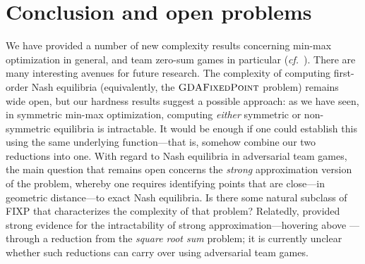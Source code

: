 \section{Conclusion and open problems}

We have provided a number of new complexity results concerning min-max optimization in general, and team zero-sum games in particular (\emph{cf.}~). There are many interesting avenues for future research. The complexity of computing first-order Nash equilibria (equivalently, the $\textsc{GDAFixedPoint}$ problem) remains wide open, but our hardness results suggest a possible approach: as we have seen, in symmetric min-max optimization, computing \emph{either} symmetric or non-symmetric equilibria is intractable. It would be enough if one could establish this using the same underlying function---that is, somehow combine our two reductions into one. With regard to Nash equilibria in adversarial team games, the main question that remains open concerns the \emph{strong} approximation version of the problem, whereby one requires identifying points that are close---in geometric distance---to exact Nash equilibria. Is there some natural subclass of \textsf{FIXP} that characterizes the complexity of that problem? Relatedly, \citet{Etessami10:On} provided strong evidence for the intractability of strong approximation---hovering above \NP---through a reduction from the \emph{square root sum} problem; it is currently unclear whether such reductions can carry over using adversarial team games.